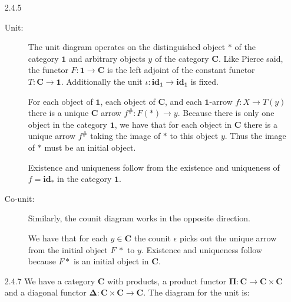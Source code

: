 \documentclass{article}
\newcommand{\one}{\mathbf{1}}
\newcommand{\ccat}{\mathbf{C}}
\newcommand{\id}{\mathbf{id}}
\newcommand{\pifun}{\mathbf{\Pi}}
\newcommand{\diagfun}{\mathbf{\Delta}}
\begin{document}
\begin{enumerate}
\item [2.4.5]
  \begin{description}
  \item [Unit:]
    The unit diagram operates on the distinguished object $*$ of the category $\one$ and arbitrary objects $y$ of the category $\ccat$.
    Like Pierce said, the functor $F : \one \rightarrow \ccat$ is the left adjoint of the constant functor $T : \ccat \rightarrow \one$.
    Additionally the unit $\iota : \id_\one \rightarrow \id_\one$ is fixed.
    \begin{center}
    \end{center}
    For each object of $\one$, each object of $\ccat$, and each $\one$-arrow $f: X \rightarrow T(y)$ there is a unique $\ccat$ arrow $f^{\#} : F(*) \rightarrow y$.
    Because there is only one object in the category $\one$, we have that for each object in $\ccat$ there is a unique arrow $f^{\#}$ taking the image of $*$ to this object $y$.
    Thus the image of $*$ must be an initial object.

    Existence and uniqueness follow from the existence and uniqueness of $f = \id_*$ in the category $\one$.

  \vfill{}
  \item [Co-unit:]
    Similarly, the counit diagram works in the opposite direction.
    \begin{center}
    \end{center}
    We have that for each $y \in \ccat$ the counit $\epsilon$ picks out the unique arrow from the initial object $F~*$ to $y$.
    Existence and uniqueness follow because $F*$ is an initial object in $\ccat$.
  \end{description}
  \vfill{}
\newpage
\item[2.4.7]
  We have a category $\ccat$ with products, a product functor $\pifun : \ccat \rightarrow \ccat \times \ccat$ and a diagonal functor $\diagfun : \ccat \times \ccat \rightarrow \ccat$.
  The diagram for the unit is:
  \begin{center}
\end{center}
\end{enumerate}
\end{document}
